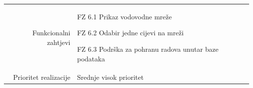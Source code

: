 \documentclass[]{report}
\begin{document}
\begin{tabular}{rp{}}
\\
Funkcionalni zahtjevi &

\begin{compactitem} 
    \item FZ 6.1 Prikaz vodovodne mreže
    \item FZ 6.2 Odabir jedne cijevi na mreži
    \item FZ 6.3 Podrška za pohranu radova unutar baze podataka
\end{compactitem}

\\
Prioritet realizacije &
\hspace{12pt} Srednje visok prioritet
\end{tabular}

\end{document}
